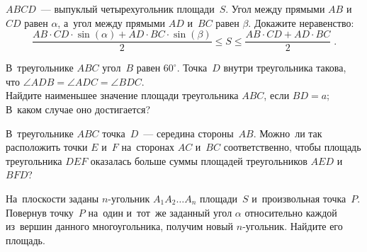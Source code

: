 \begin{problems}
\item
$ABCD$~--- выпуклый четырехугольник площади~$S$.
Угол между прямыми $AB$ и~$CD$ равен $\alpha$, а~угол между прямыми $AD$ и~$BC$
равен $\beta$.
Докажите неравенство:
\[
    \frac{AB \cdot CD \cdot \sin(\alpha) + AD \cdot BC \cdot \sin(\beta)}{2}
\leq
    S
\leq
    \frac{AB \cdot CD + AD \cdot BC}{2}
\; . \]

\item
В~треугольнике $ABC$ угол~$B$ равен $60^{\circ}$.
Точка~$D$ внутри треугольника такова, что
$\angle ADB = \angle ADC = \angle BDC$.
\\
\subproblem
Найдите наименьшее значение площади треугольника $ABC$, если $BD = a$;
\\
\subproblem
В~каком случае оно достигается?

\item
В~треугольнике $ABC$ точка~$D$~--- середина стороны~$AB$.
Можно~ли так расположить точки $E$ и~$F$ на~сторонах $AC$ и~$BC$
соответственно, чтобы площадь треугольника $DEF$ оказалась больше суммы
площадей треугольников $AED$ и~$BFD$?

\item
На~плоскости заданы $n$-угольник $A_{1}A_{2}{\ldots}A_{n}$ площади~$S$
и~произвольная точка~$P$.
Повернув точку~$P$ на~один и~тот~же заданный угол $\alpha$ относительно каждой
из~вершин данного многоугольника, получим новый $n$-угольник.
Найдите его площадь.

\end{problems}

